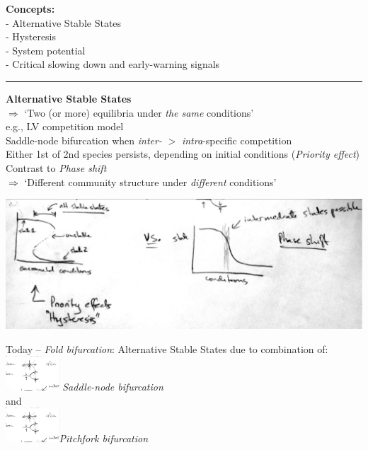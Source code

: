 \documentclass{article}
\newcommand{\ind}{\-\hspace{1cm}}
\begin{document}
\noindent{}

\textbf{Concepts:}\\
\ind - Alternative Stable States\\
\ind - Hysteresis\\
\ind - System potential\\
\ind - Critical slowing down and early-warning signals

\rule[0.5ex]{\linewidth}{1pt}
\textbf{Alternative Stable States}\\
 $\Rightarrow$ `Two (or more) equilibria under \emph{the same} conditions'\\
e.g., LV competition model\\
\ind Saddle-node bifurcation when \emph{inter-} $>$ \emph{intra}-specific competition\\
\ind \ind Either 1st of 2nd species persists, depending on initial conditions (\emph{Priority effect})\\

Contrast to \emph{Phase shift}\\
 $\Rightarrow$ `Different community structure under \emph{different} conditions'
 
\includegraphics[width=16cm]{figs/Fold_vs_Phase.pdf}

Today -- \emph{Fold bifurcation}:  Alternative Stable States due to combination of:\\
\ind \includegraphics[width=2cm]{figs/SaddleNode.pdf} \ind  \emph{Saddle-node bifurcation}\\
\ind and\\
\ind  \includegraphics[width=2cm]{figs/Pitchfork.pdf}\ind \emph{Pitchfork bifurcation}\\
\end{document}
